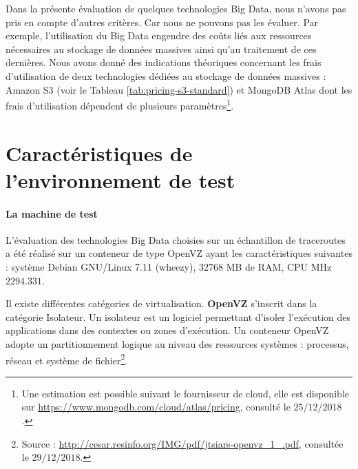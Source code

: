 Dans la présente évaluation de quelques technologies Big Data, nous n'avons pas pris en compte d'autres critères. Car nous ne pouvons pas les évaluer. Par exemple, l'utilisation du  Big Data engendre des coûts  liés aux ressources nécessaires au stockage de données massives ainsi qu'au traitement de ces dernières. Nous avons donné des indications théoriques concernant les frais d'utilisation de deux technologies dédiées au stockage de données massives : Amazon S3 (voir le Tableau \ref{tab:pricing-s3-standard}) et MongoDB Atlas dont les frais d'utilisation  dépendent de plusieurs paramètres\footnote{Une estimation est possible suivant le fournisseur de cloud, elle est disponible  sur \url{https://www.mongodb.com/cloud/atlas/pricing}, consulté le $25/12/2018$.}. 

\section{Caractéristiques de l'environnement de test} \label{machine-openvz-caracteritics}

\paragraph{La machine de test} L'évaluation des technologies Big Data choisies sur un échantillon de traceroutes a été réalisé sur un conteneur de type OpenVZ ayant les caractéristiques suivantes :  système Debian GNU/Linux 7.11 (wheezy),  32768 MB de  RAM, CPU MHz $ 2294.331 $.

\begin{tcolorbox}
	Il existe différentes catégories de virtualisation. \textbf{OpenVZ} s'inscrit dans la catégorie Isolateur. Un isolateur est un logiciel permettant d'isoler l'exécution des applications dans des contextes ou zones d'exécution. Un conteneur OpenVZ  adopte un partitionnement logique au niveau des ressources systèmes : processus, réseau et système de fichier\footnote{Source : \url{http://cesar.resinfo.org/IMG/pdf/jtsiars-openvz_1_.pdf}, consultée le $29/12/2018$.}.
\end{tcolorbox}

